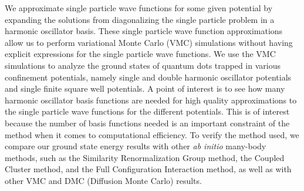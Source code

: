 \documentclass[../main.tex]{subfiles}
\begin{document}
\noindent
We approximate single particle wave functions for some given potential by expanding the solutions from diagonalizing the single particle problem in a harmonic oscillator basis. These single particle wave function approximations allow us to perform variational Monte Carlo (VMC) simulations without having explicit expressions for the single particle wave functions. We use the VMC simulations to analyze the ground states of quantum dots trapped in various confinement potentials, namely single and double harmonic oscillator potentials and single finite square well potentials. A point of interest is to see how many harmonic oscillator basis functions are needed for high quality approximations to the single particle wave functions for the different potentials. This is of interest because the number of basis functions needed is an important constraint of the method when it comes to computational efficiency. To verify the method used, we compare our ground state energy results with other \emph{ab initio} many-body methods, such as the Similarity Renormalization Group method, the Coupled Cluster method, and the Full Configuration Interaction method, as well as with other VMC and DMC (Diffusion Monte Carlo) results.
\end{document}
